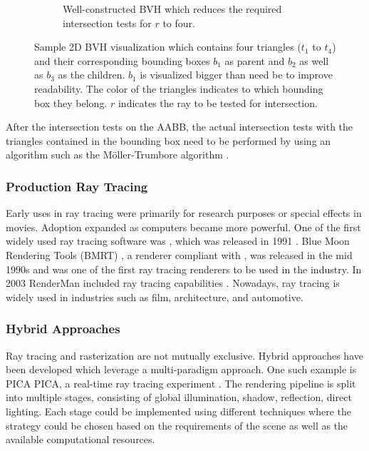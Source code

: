 \begin{figure}[H]
\begin{subfigure}[b]{0.45\textwidth}
    \caption{Well-constructed \gls{BVH} which reduces the required intersection tests for $r$ to four.}
    \label{fig:bvhGood}
  \end{subfigure}
  \caption{Sample 2D \gls{BVH} visualization which contains four triangles ($t_1$ to $t_4$) and their corresponding bounding boxes $b_1$ as parent and $b_2$ as well as $b_3$ as the children. $b_1$ is visualized bigger than need be to improve readability. The color of the triangles indicates to which bounding box they belong. $r$ indicates the ray to be tested for intersection.}
  \label{fig:bvhVisualized}
\end{figure}

After the intersection tests on the \gls{AABB}, the actual intersection tests with the triangles contained in the bounding box need to be performed by using an algorithm such as the Möller-Trumbore algorithm \cite{mollerTrumboreFastRayTriangleIntersection}.

\subsubsection{Production Ray Tracing}

Early uses in ray tracing were primarily for research purposes or special effects in movies. Adoption expanded as computers became more powerful. One of the first widely used ray tracing software was , which was released in 1991 \cite{POV_Ray_Documentation}. Blue Moon Rendering Tools (\gls{BMRT}) \cite{bmrt}, a renderer compliant with , was released in the mid 1990s and was one of the first ray tracing renderers to be used in the industry. In 2003 \gls{RenderMan} included ray tracing capabilities \cite{RenderMan_11_Release_Notes}. Nowadays, ray tracing is widely used in industries such as film, architecture, and automotive.

\subsubsection{Hybrid Approaches}

Ray tracing and rasterization are not mutually exclusive. Hybrid approaches have been developed which leverage a multi-paradigm approach. One such example is PICA PICA, a real-time ray tracing experiment \cite{hybridRenderingBarreBrisebois2019}. The rendering pipeline is split into multiple stages, consisting of global illumination, shadow, reflection, direct lighting. Each stage could be implemented using different techniques where the strategy could be chosen based on the requirements of the scene as well as the available computational resources.

